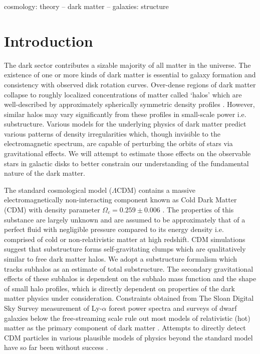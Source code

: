 \documentclass[usenatbib]{mnras}
\newcommand{\lcdm}{$\Lambda$CDM}
\begin{document}
\begin{keywords}
cosmology: theory -- dark matter -- galaxies: structure
\end{keywords}

\section{Introduction}

The dark sector contributes a sizable majority of all matter in the universe. The existence of one or more kinds of dark matter is essential to galaxy formation and consistency with observed disk rotation curves. Over-dense regions of dark matter collapse to roughly localized concentrations of matter called ‘halos’ which are well-described by approximately spherically symmetric density profiles \citep{structure}. However, similar halos may vary significantly from these profiles in small-scale power i.e. substructure. Various models for the underlying physics of dark matter predict various patterns of density irregularities which, though invisible to the electromagnetic spectrum, are capable of perturbing the orbits of stars via gravitational effects. We will attempt to estimate those effects on the observable stars in galactic disks to better constrain our understanding of the fundamental nature of the dark matter.
             
\par 

The standard cosmological model (\lcdm) contains a massive electromagnetically non-interacting component known as Cold Dark Matter (CDM) with density parameter $\Omega_c = 0.259 \pm 0.006$ \citep{planck}. The properties of this substance are largely unknown and are assumed to be approximately that of a perfect fluid with negligible pressure compared to its energy density i.e. comprised of cold or non-relativistic matter at high redshift. CDM simulations suggest that substructure forms self-gravitating clumps which are qualitatively similar to free dark matter halos. We adopt a substructure formalism which tracks subhalos as an estimate of total substructure. The secondary gravitational effects of these subhalos is dependent on the subhalo mass function and the shape of small halo profiles, which is directly dependent on properties of the dark matter physics under consideration. Constraints obtained from The Sloan Digital Sky Survey measurement of Ly-$\alpha$ forest power spectra and surveys of dwarf galaxies below the free-streaming scale rule out most models of relativistic (hot) matter as the primary component of dark matter \citep{can_neutrinos}. Attempts to directly detect CDM particles in various plausible models of physics beyond the standard model have so far been without success \citep{direct_detection}.
	  
\end{document}
